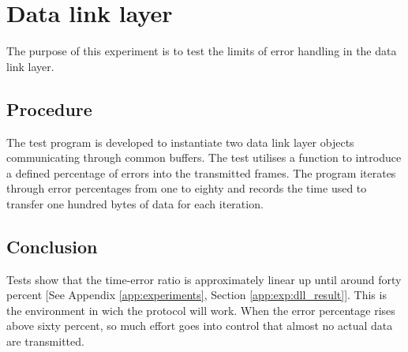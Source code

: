 \section{Data link layer}
The purpose of this experiment is to test the limits of error handling in the
data link layer.

\subsection{Procedure}
The test program  is developed to instantiate two data
link layer objects communicating through common buffers. The test utilises a
function  to introduce a defined percentage of errors
into the transmitted frames. The program iterates through error percentages from
one to eighty and records the time used to transfer one hundred bytes of data
for each iteration.

\subsection{Conclusion}
Tests  show that the time-error ratio is approximately linear up until around
forty percent [See Appendix \ref{app:experiments}, Section \ref{app:exp:dll_result}]. This is the environment in wich the protocol will work. When the
error percentage rises above sixty percent, so much effort goes into control
that almost no actual data are transmitted.

